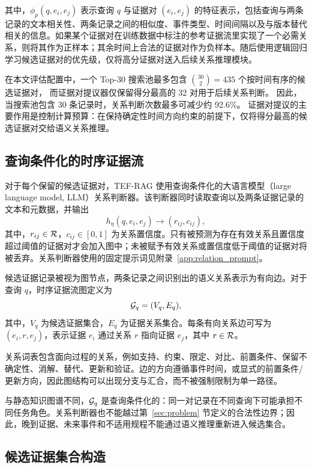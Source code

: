 其中，$\phi_p(q,e_i,e_j)$ 表示查询 $q$ 与证据对 $(e_i,e_j)$ 的特征表示，包括查询与两条记录的文本相关性、两条记录之间的相似度、事件类型、时间间隔以及与版本替代相关的信息。如果某个证据对在训练数据中标注的参考证据流里实现了一个必需关系，则将其作为正样本；其余时间上合法的证据对作为负样本。随后使用逻辑回归学习候选证据对的优先级，仅将高分证据对送入后续关系推理模块。

在本文评估配置中，一个 Top-30 搜索池最多包含
$\binom{30}{2}=435$ 个按时间有序的候选证据对，
而证据对提议器仅保留得分最高的 32 对用于后续关系判断。
因此，当搜索池包含 30 条记录时，关系判断次数最多可减少约 92.6\%。
证据对提议的主要作用是控制计算预算：在保持确定性时间方向约束的前提下，仅将得分最高的候选证据对交给语义关系推理。

\subsection{查询条件化的时序证据流}

对于每个保留的候选证据对，TEF-RAG 使用查询条件化的大语言模型（large language model, LLM）关系判断器。该判断器同时读取查询以及两条证据记录的文本和元数据，并输出
\begin{equation}
h_{\eta}(q,e_i,e_j)
\rightarrow
(r_{ij},c_{ij}),
\end{equation}
其中，$r_{ij}\in\mathcal{R}$，$c_{ij}\in[0,1]$ 为关系置信度。只有被预测为存在有效关系且置信度超过阈值的证据对才会加入图中；未被赋予有效关系或置信度低于阈值的证据对将被丢弃。关系判断器使用的固定提示词见附录~\ref{app:relation_prompt}。

候选证据记录被视为图节点，两条记录之间识别出的语义关系表示为有向边。对于查询 $q$，时序证据流图定义为
\begin{equation}
\mathcal{G}_q=(V_q,E_q),
\end{equation}
其中，$V_q$ 为候选证据集合，$E_q$ 为证据关系集合。每条有向关系边可写为 $(e_i,r,e_j)$，表示证据 $e_i$ 通过关系 $r$ 指向证据 $e_j$，其中 $r\in\mathcal{R}$。

关系词表包含面向过程的关系，例如支持、约束、限定、对比、前置条件、保留不确定性、消解、替代、更新和验证。边的方向遵循事件时间，或显式的前置条件/更新方向，因此图结构可以出现分支与汇合，而不被强制限制为单一路径。

与静态知识图谱不同，$\mathcal{G}_q$ 是查询条件化的：同一对记录在不同查询下可能承担不同任务角色。关系判断器也不能越过第~\ref{sec:problem} 节定义的合法性边界；因此，晚到证据、未来事件和不适用规程不能通过语义推理重新进入候选集合。

\subsection{候选证据集合构造}

